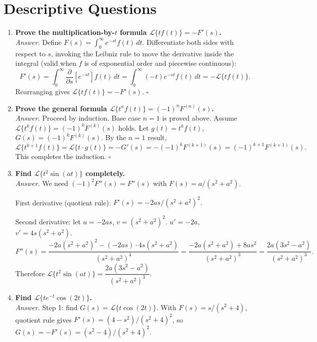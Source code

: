 \documentclass[12pt,a4paper]{article}
\begin{document}
\section{Descriptive Questions}
\begin{enumerate}

\item \textbf{Prove the multiplication-by-$t$ formula
$\mathcal{L}\{tf(t)\}=-F'(s)$.}\\
\textit{Answer.} Define $F(s)=\int_0^\infty e^{-st}f(t)\,dt$. Differentiate
both sides with respect to $s$, invoking the Leibniz rule to move the derivative
inside the integral (valid when $f$ is of exponential order and piecewise
continuous):
\[
  F'(s)=\int_0^\infty \frac{\partial}{\partial s}[e^{-st}]f(t)\,dt
  =\int_0^\infty(-t)e^{-st}f(t)\,dt = -\mathcal{L}\{tf(t)\}.
\]
Rearranging gives $\mathcal{L}\{tf(t)\}=-F'(s)$. $\square$

\item \textbf{Prove the general formula
$\mathcal{L}\{t^n f(t)\}=(-1)^n F^{(n)}(s)$.}\\
\textit{Answer.} Proceed by induction. Base case $n=1$ is proved above. Assume
$\mathcal{L}\{t^{k}f(t)\}=(-1)^k F^{(k)}(s)$ holds. Let
$g(t)=t^k f(t)$, $G(s)=(-1)^k F^{(k)}(s)$. By the $n=1$ result,
\[
  \mathcal{L}\{t^{k+1}f(t)\}=\mathcal{L}\{t\cdot g(t)\}
  =-G'(s)=-(-1)^k F^{(k+1)}(s)=(-1)^{k+1}F^{(k+1)}(s).
\]
This completes the induction. $\square$

\item \textbf{Find $\mathcal{L}\{t^2\sin(at)\}$ completely.}\\
\textit{Answer.} We need $(-1)^2 F''(s)=F''(s)$ with $F(s)=a/(s^2+a^2)$.

First derivative (quotient rule):
$F'(s) = -2as/(s^2+a^2)^2.$

Second derivative: let $u=-2as$, $v=(s^2+a^2)^2$.
$u'=-2a$, $v'=4s(s^2+a^2)$.
\[
F''(s)=\frac{-2a(s^2+a^2)^2-(-2as)\cdot 4s(s^2+a^2)}{(s^2+a^2)^4}
= \frac{-2a(s^2+a^2)+8as^2}{(s^2+a^2)^3}
= \frac{2a(3s^2-a^2)}{(s^2+a^2)^3}.
\]
Therefore $\mathcal{L}\{t^2\sin(at)\}=\dfrac{2a(3s^2-a^2)}{(s^2+a^2)^3}.$

\item \textbf{Find $\mathcal{L}\{te^{-t}\cos(2t)\}$.}\\
\textit{Answer.} Step 1: find $G(s)=\mathcal{L}\{t\cos(2t)\}$.
With $F(s)=s/(s^2+4)$, quotient rule gives
$F'(s)=(4-s^2)/(s^2+4)^2$, so
$G(s)=-F'(s)=(s^2-4)/(s^2+4)^2$.


\end{enumerate}
\end{document}
